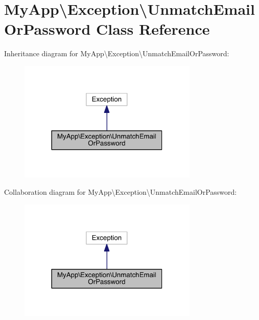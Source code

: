 \hypertarget{class_my_app_1_1_exception_1_1_unmatch_email_or_password}{}\section{My\+App\textbackslash{}Exception\textbackslash{}Unmatch\+Email\+Or\+Password Class Reference}
\label{class_my_app_1_1_exception_1_1_unmatch_email_or_password}


Inheritance diagram for My\+App\textbackslash{}Exception\textbackslash{}Unmatch\+Email\+Or\+Password\+:
\nopagebreak
\begin{figure}[H]
\begin{center}
\leavevmode
\includegraphics[width=242pt]{class_my_app_1_1_exception_1_1_unmatch_email_or_password__inherit__graph}
\end{center}
\end{figure}


Collaboration diagram for My\+App\textbackslash{}Exception\textbackslash{}Unmatch\+Email\+Or\+Password\+:
\nopagebreak
\begin{figure}[H]
\begin{center}
\leavevmode
\includegraphics[width=242pt]{class_my_app_1_1_exception_1_1_unmatch_email_or_password__coll__graph}
\end{center}
\end{figure}
